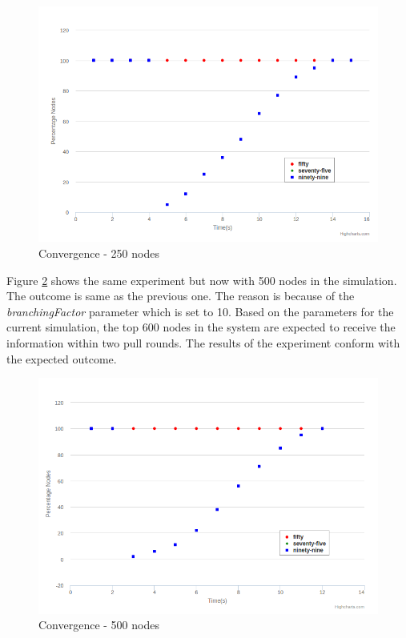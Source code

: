 \documentclass[12pt,a4paper,twoside,openright]{book}
\begin{document}
\begin{figure}[h]
	\includegraphics[scale=0.5]{250Convergence}
	\caption{Convergence - 250 nodes}
	\label{fig:250conv}
\end{figure}


Figure \ref{fig:500conv} shows the same experiment but now with 500 nodes in the simulation. The outcome is same as the previous one. The reason is because of the \textit{branchingFactor} parameter which is set to 10. Based on the parameters for the current simulation, the top 600 nodes in the system are expected to receive the information within two pull rounds. The results of the experiment conform with the expected outcome.


\begin{figure}
	\includegraphics[scale=0.5]{500Convergence}
	\caption{Convergence - 500 nodes}
	\label{fig:500conv}
\end{figure}
\end{document}
